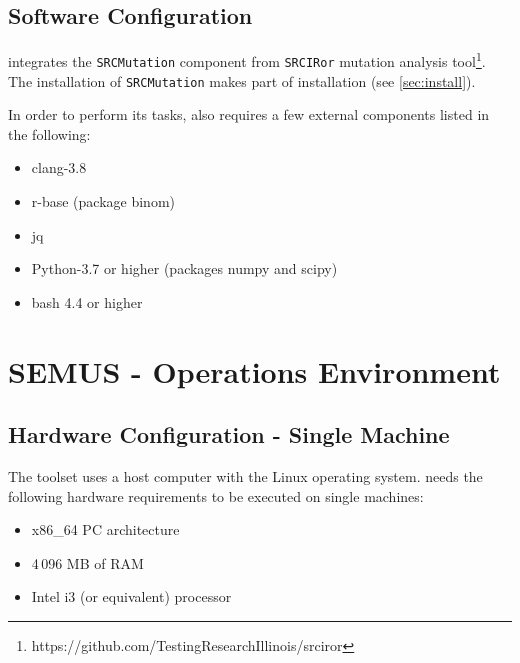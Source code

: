 \section{Software Configuration}

\MASS integrates the \texttt{SRCMutation} component from \texttt{SRCIRor} mutation analysis tool\footnote{https://github.com/TestingResearchIllinois/srciror}. The installation of \texttt{SRCMutation} makes part of \MASS installation (see \ref{sec:install}).

In order to perform its tasks, \MASS also requires a few external components listed in the following:

\begin{itemize}
	\item clang-3.8
	\item r-base (package binom)
	\item jq
	\item Python-3.7 or higher (packages numpy and scipy)
	\item bash 4.4 or higher
\end{itemize}



\chapter{SEMUS - Operations Environment}
\label{chapter:semus:operationsEnv}

\section{Hardware Configuration - Single Machine}

The \SEMUS toolset uses a host computer with the Linux operating system. \SEMUS needs the following hardware requirements to be executed on single machines:

\begin{itemize}
	\item x86\_64 PC architecture
	\item 4\,096 MB of RAM
	\item Intel i3 (or equivalent) processor
\end{itemize}


